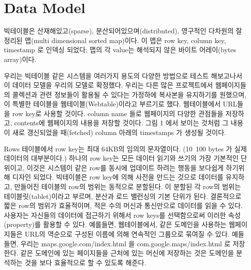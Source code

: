 \documentclass[twocolumn]{article}
\begin{document}
\section{Data Model}
빅테이블은 산재해있고(sparse), 분산되어있으며(distributed), 영구적인 다차원의 잘 정리된 맵(multi dimensional sorted map)이다. 이 맵은 row key, column key, timestamp 로 인덱싱 되었다; 맵의 각 value는 해석되지 않은 바이트 어레이(bytes array)이다.

우리는 빅테이블 같은 시스템을 여러가지 용도의 다양한 방법으로 테스트 해보고나서 이 데이터 모델을 우리의 모델로 확정했다. 우리는 다른 많은 프로젝트에서 웹페이지들의 콜렉션과 관련 정보들이 활용될 수 있다는 가정하에 복사본을 유지하기를 원했으며, 이 특별한 테이블을 웹테이블(Webtable)이라고 부르기로 했다. 웹테이블에서 URL들을 row key로 사용할 것이다. column name 들로 웹페이지의 다양한 관점들을 저장하고, contents에 웹페이지의 내용을 저장할 것이다. 그림 1 에서 보이는 것처럼 그 내용이 새로 갱신되었을 때(fetched) column 아래의 timestamps 가 생성될 것이다.
 
Rows
 테이블에서 row key는 최대 64KB의 임의의 문자열이다. (10~100 bytes 가 실제 데이터의 대부분이다.)
하나의 row key는 모든 데이터 읽기와 쓰기의 가장 기본적인 단위이고, 이것은 시스템이 같은 row를 동시에 업데이트 하려는 행동을 보다쉽게 하기위해 디자인 되었다.
 빅테이블은 row key에 의해 사전을 만드는 것으로 데이터를 유지하고, 만들어진 테이블의 row의 범위는 동적으로 분할된다. 이 분할된 각 row의 범위는 테이블릿(tablet)이라고 부르며, 분산과 로드 밸런싱의 기본 단위가 된다. 결론적으로 짧은 row의 범위가 효율적이며, 적은 수의 머신과 통신만으로 데이터를 읽을 수 있다. 사용자는 자신들의 데이터에 접근하기 위해서 row keys를 선택함으로써 이러한 속성(property)를 활용할 수 있다.
예를들면, 웹테이블에서, 같은 도메인을 사용하는 웹페이지들은 URL의 역순으로 구성된 이름에 의해 연속적인 그룹으로 묶여질 수 있다. 예들들면, 우리는 maps.google.com/index.html 을 com.google.maps/index.html 로 저장한다. 같은 도메인에 있는 페이지들을 근처에 있는 머신에 저장하는 것은 도메인을 분석하는 것을 보다 효율적으로 할 수 있도록 해준다.
 
\end{document}

